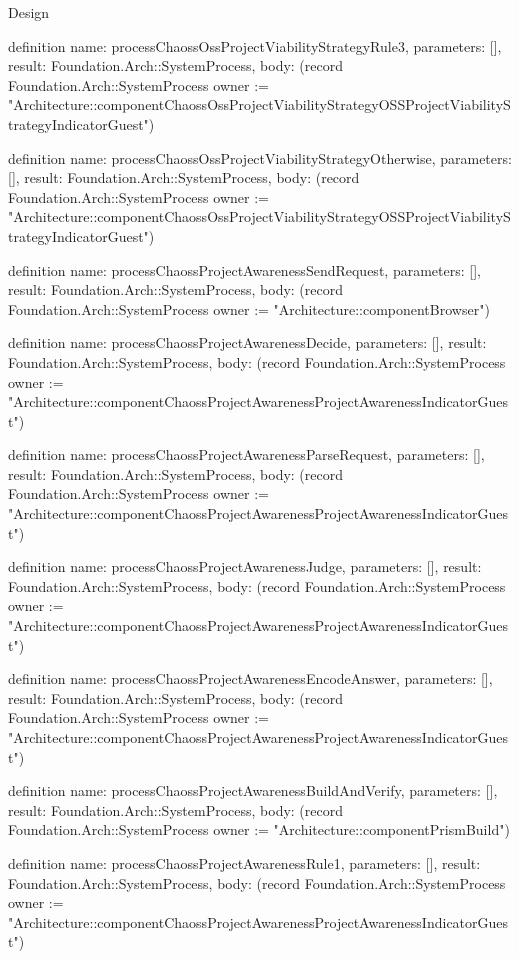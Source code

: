 \begin{lexlean}{Design}
\begin{semanticmodule}
definition{
  name: processChaossOssProjectViabilityStrategyRule3,
  parameters: [],
  result: Foundation.Arch::SystemProcess,
  body: (record Foundation.Arch::SystemProcess {owner := "Architecture::componentChaossOssProjectViabilityStrategyOSSProjectViabilityStrategyIndicatorGuest"})
}

definition{
  name: processChaossOssProjectViabilityStrategyOtherwise,
  parameters: [],
  result: Foundation.Arch::SystemProcess,
  body: (record Foundation.Arch::SystemProcess {owner := "Architecture::componentChaossOssProjectViabilityStrategyOSSProjectViabilityStrategyIndicatorGuest"})
}

definition{
  name: processChaossProjectAwarenessSendRequest,
  parameters: [],
  result: Foundation.Arch::SystemProcess,
  body: (record Foundation.Arch::SystemProcess {owner := "Architecture::componentBrowser"})
}

definition{
  name: processChaossProjectAwarenessDecide,
  parameters: [],
  result: Foundation.Arch::SystemProcess,
  body: (record Foundation.Arch::SystemProcess {owner := "Architecture::componentChaossProjectAwarenessProjectAwarenessIndicatorGuest"})
}

definition{
  name: processChaossProjectAwarenessParseRequest,
  parameters: [],
  result: Foundation.Arch::SystemProcess,
  body: (record Foundation.Arch::SystemProcess {owner := "Architecture::componentChaossProjectAwarenessProjectAwarenessIndicatorGuest"})
}

definition{
  name: processChaossProjectAwarenessJudge,
  parameters: [],
  result: Foundation.Arch::SystemProcess,
  body: (record Foundation.Arch::SystemProcess {owner := "Architecture::componentChaossProjectAwarenessProjectAwarenessIndicatorGuest"})
}

definition{
  name: processChaossProjectAwarenessEncodeAnswer,
  parameters: [],
  result: Foundation.Arch::SystemProcess,
  body: (record Foundation.Arch::SystemProcess {owner := "Architecture::componentChaossProjectAwarenessProjectAwarenessIndicatorGuest"})
}

definition{
  name: processChaossProjectAwarenessBuildAndVerify,
  parameters: [],
  result: Foundation.Arch::SystemProcess,
  body: (record Foundation.Arch::SystemProcess {owner := "Architecture::componentPrismBuild"})
}

definition{
  name: processChaossProjectAwarenessRule1,
  parameters: [],
  result: Foundation.Arch::SystemProcess,
  body: (record Foundation.Arch::SystemProcess {owner := "Architecture::componentChaossProjectAwarenessProjectAwarenessIndicatorGuest"})
}


\end{semanticmodule}
\end{lexlean}
